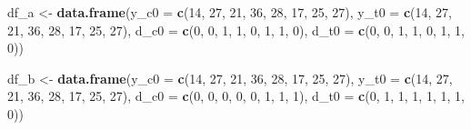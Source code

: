 \documentclass[12pt,leqno]{article}
\newenvironment{Shaded}{\begin{snugshade}}{\end{snugshade}}
\newcommand{\DataTypeTok}[1]{\textcolor[rgb]{0.13,0.29,0.53}{#1}}
\newcommand{\DecValTok}[1]{\textcolor[rgb]{0.00,0.00,0.81}{#1}}
\newcommand{\KeywordTok}[1]{\textcolor[rgb]{0.13,0.29,0.53}{\textbf{#1}}}
\newcommand{\NormalTok}[1]{#1}
\newcommand{\StringTok}[1]{\textcolor[rgb]{0.31,0.60,0.02}{#1}}
\theoremstyle{newstyle}
\begin{document}
\begin{Shaded}
\begin{Highlighting}[]
\NormalTok{df\_a \textless{}{-}}\StringTok{ }\KeywordTok{data.frame}\NormalTok{(}\DataTypeTok{y\_c0 =} \KeywordTok{c}\NormalTok{(}\DecValTok{14}\NormalTok{, }\DecValTok{27}\NormalTok{, }\DecValTok{21}\NormalTok{, }\DecValTok{36}\NormalTok{, }\DecValTok{28}\NormalTok{, }\DecValTok{17}\NormalTok{, }\DecValTok{25}\NormalTok{, }\DecValTok{27}\NormalTok{),}
                   \DataTypeTok{y\_t0 =} \KeywordTok{c}\NormalTok{(}\DecValTok{14}\NormalTok{, }\DecValTok{27}\NormalTok{, }\DecValTok{21}\NormalTok{, }\DecValTok{36}\NormalTok{, }\DecValTok{28}\NormalTok{, }\DecValTok{17}\NormalTok{, }\DecValTok{25}\NormalTok{, }\DecValTok{27}\NormalTok{),}
                   \DataTypeTok{d\_c0 =} \KeywordTok{c}\NormalTok{(}\DecValTok{0}\NormalTok{, }\DecValTok{0}\NormalTok{, }\DecValTok{1}\NormalTok{, }\DecValTok{1}\NormalTok{, }\DecValTok{0}\NormalTok{, }\DecValTok{1}\NormalTok{, }\DecValTok{1}\NormalTok{, }\DecValTok{0}\NormalTok{),}
                   \DataTypeTok{d\_t0 =} \KeywordTok{c}\NormalTok{(}\DecValTok{0}\NormalTok{, }\DecValTok{0}\NormalTok{, }\DecValTok{1}\NormalTok{, }\DecValTok{1}\NormalTok{, }\DecValTok{0}\NormalTok{, }\DecValTok{1}\NormalTok{, }\DecValTok{1}\NormalTok{, }\DecValTok{0}\NormalTok{))}

\NormalTok{df\_b \textless{}{-}}\StringTok{ }\KeywordTok{data.frame}\NormalTok{(}\DataTypeTok{y\_c0 =} \KeywordTok{c}\NormalTok{(}\DecValTok{14}\NormalTok{, }\DecValTok{27}\NormalTok{, }\DecValTok{21}\NormalTok{, }\DecValTok{36}\NormalTok{, }\DecValTok{28}\NormalTok{, }\DecValTok{17}\NormalTok{, }\DecValTok{25}\NormalTok{, }\DecValTok{27}\NormalTok{),}
                   \DataTypeTok{y\_t0 =} \KeywordTok{c}\NormalTok{(}\DecValTok{14}\NormalTok{, }\DecValTok{27}\NormalTok{, }\DecValTok{21}\NormalTok{, }\DecValTok{36}\NormalTok{, }\DecValTok{28}\NormalTok{, }\DecValTok{17}\NormalTok{, }\DecValTok{25}\NormalTok{, }\DecValTok{27}\NormalTok{),}
                   \DataTypeTok{d\_c0 =} \KeywordTok{c}\NormalTok{(}\DecValTok{0}\NormalTok{, }\DecValTok{0}\NormalTok{, }\DecValTok{0}\NormalTok{, }\DecValTok{0}\NormalTok{, }\DecValTok{0}\NormalTok{, }\DecValTok{1}\NormalTok{, }\DecValTok{1}\NormalTok{, }\DecValTok{1}\NormalTok{),}
                   \DataTypeTok{d\_t0 =} \KeywordTok{c}\NormalTok{(}\DecValTok{0}\NormalTok{, }\DecValTok{1}\NormalTok{, }\DecValTok{1}\NormalTok{, }\DecValTok{1}\NormalTok{, }\DecValTok{1}\NormalTok{, }\DecValTok{1}\NormalTok{, }\DecValTok{1}\NormalTok{, }\DecValTok{0}\NormalTok{))}


\end{Highlighting}
\end{Shaded}
\end{document}
